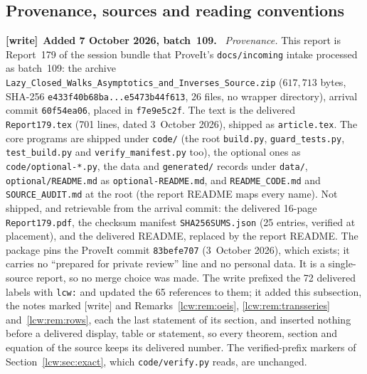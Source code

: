 \documentclass[11pt,letterpaper]{article}
\theoremstyle{remark}\newtheorem{remark}[theorem]{Remark}
\newcommand{\file}[1]{\nolinkurl{#1}}
\newenvironment{writenote}[1][]{\par\smallskip\begingroup\small
 \noindent\textbf{[write]}\if\relax\detokenize{#1}\relax\else~\textbf{#1.}\fi\ }%
 {\par\endgroup\smallskip}
\begin{document}
\subsection{Provenance, sources and reading conventions}\label{lcw:sec:provenance}
\begin{writenote}[Added 7 October 2026, batch~109]
\emph{Provenance.} This report is Report~179 of the session bundle that
ProveIt's \file{docs/incoming} intake processed as batch~109: the archive
\file{Lazy_Closed_Walks_Asymptotics_and_Inverses_Source.zip}
($617{,}713$ bytes, SHA-256 \file{e433f40b68ba...e5473b44f613}, 26 files, no
wrapper directory), arrival commit \file{60f54ea06}, placed in
\file{f7e9e5c2f}. The text is the delivered \file{Report179.tex} (701 lines,
dated 3~October 2026), shipped as \file{article.tex}. The core programs are
shipped under \file{code/} (the root \file{build.py}, \file{guard\_tests.py},
\file{test\_build.py} and \file{verify\_manifest.py} too), the optional ones
as \file{code/optional-*.py}, the data and \file{generated/} records under
\file{data/}, \file{optional/README.md} as \file{optional-README.md}, and
\file{README\_CODE.md} and \file{SOURCE\_AUDIT.md} at the root (the report
README maps every name). Not shipped, and retrievable from the arrival
commit: the delivered 16-page \file{Report179.pdf}, the checksum manifest
\file{SHA256SUMS.json} (25 entries, verified at placement), and the delivered
README, replaced by the report README. The package pins the ProveIt commit
\file{83befe707} (3~October 2026), which exists; it carries no ``prepared
for private review'' line and no personal data. It is a single-source
report, so no merge choice was made. The write prefixed the 72 delivered
labels with \file{lcw:} and updated the 65 references to them; it added this
subsection, the notes marked [write] and Remarks~\ref{lcw:rem:oeis},
\ref{lcw:rem:transseries} and~\ref{lcw:rem:rows}, each the last statement of
its section, and inserted nothing before a delivered display, table or
statement, so every theorem, section and equation of the source keeps its
delivered number. The verified-prefix markers of Section~\ref{lcw:sec:exact},
which \file{code/verify.py} reads, are unchanged.


\end{writenote}
\end{document}
